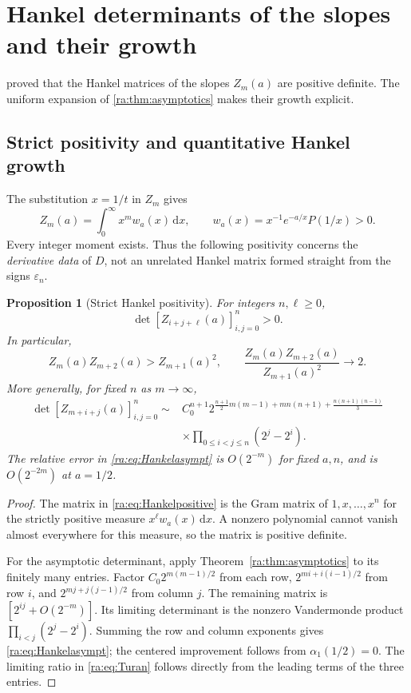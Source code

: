 \documentclass[11pt,a4paper,oneside,openany]{book}
\numberwithin{equation}{chapter}
\newtheorem{proposition}[theorem]{Proposition}
\theoremstyle{definition}
\theoremstyle{remark}
\newcommand{\eps}{\varepsilon}
\newcommand{\dd}{\,\mathrm d}
\begin{document}
\section{Hankel determinants of the slopes and their growth}
\label{ra:sec:moments}
 proved that the Hankel matrices of the slopes
$Z_m(a)$ are positive definite. The uniform expansion of
\cref{ra:thm:asymptotics} makes their growth explicit.

\subsection{Strict positivity and quantitative Hankel growth}
The substitution $x=1/t$ in $Z_m$ gives
\begin{equation}\label{ra:eq:Cmoment}
 Z_m(a)=\int_0^\infty x^m w_a(x)\dd x,
 \qquad w_a(x)=x^{-1}e^{-a/x}P(1/x)>0.
\end{equation}
Every integer moment exists. Thus the following positivity concerns the
\emph{derivative data} of $D$, not an unrelated Hankel matrix formed
straight from the signs $\eps_n$.

\begin{proposition}[Strict Hankel positivity]\label{ra:prop:Hankel}
For integers $n,\ell\ge0$,
\begin{equation}\label{ra:eq:Hankelpositive}
 \det[Z_{i+j+\ell}(a)]_{i,j=0}^n>0.
\end{equation}
In particular,
\begin{equation}\label{ra:eq:Turan}
 Z_m(a)Z_{m+2}(a)>Z_{m+1}(a)^2,
 \qquad
 \frac{Z_m(a)Z_{m+2}(a)}{Z_{m+1}(a)^2}\longrightarrow2.
\end{equation}
More generally, for fixed $n$ as $m\to\infty$,
\begin{equation}\label{ra:eq:Hankelasympt}
 \begin{split}
 \det[Z_{m+i+j}(a)]_{i,j=0}^n\sim{}&C_0^{n+1}
 2^{\frac{n+1}{2}m(m-1)+mn(n+1)+\frac{n(n+1)(n-1)}3}\\
 &\times\prod_{0\le i<j\le n}(2^j-2^i).
 \end{split}
\end{equation}
The relative error in \eqref{ra:eq:Hankelasympt} is $O(2^{-m})$ for fixed
$a,n$, and is $O(2^{-2m})$ at $a=1/2$.
\end{proposition}
\begin{proof}
The matrix in \eqref{ra:eq:Hankelpositive} is the Gram matrix of
$1,x,\ldots,x^n$ for the strictly positive measure $x^\ell w_a(x)\dd x$.
A nonzero polynomial cannot vanish almost everywhere for this measure, so
the matrix is positive definite.

For the asymptotic determinant, apply Theorem~\ref{ra:thm:asymptotics} to its
finitely many entries. Factor $C_0 2^{m(m-1)/2}$ from each row,
$2^{mi+i(i-1)/2}$ from row $i$, and
$2^{mj+j(j-1)/2}$ from column $j$.
The remaining matrix is $[2^{ij}+O(2^{-m})]$.
Its limiting determinant is the nonzero Vandermonde product
$\prod_{i<j}(2^j-2^i)$. Summing the row and column exponents gives
\eqref{ra:eq:Hankelasympt}; the centered improvement follows from $\alpha_1(1/2)=0$.
The limiting ratio in \eqref{ra:eq:Turan} follows directly from the leading
terms of the three entries.
\end{proof}
\end{document}
